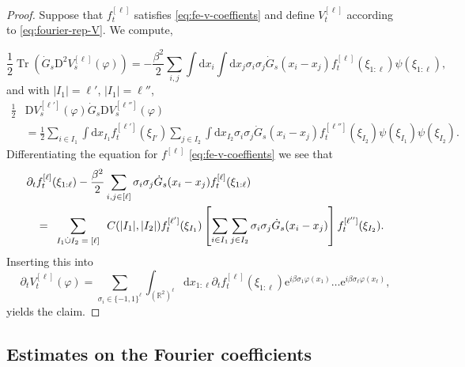 \documentclass[11pt, a4paper]{scrartcl}
\numberwithin{equation}{section}
\theoremstyle{plain}
\theoremstyle{remark}
\newcommand{\mathD}{\mathrm{D}}
\newcommand{\mathd}{\mathrm{d}}
\newcommand{\mathe}{\mathrm{e}}
\newcommand{\tmop}[1]{\ensuremath{\operatorname{#1}}}
\newcommand{\tmscript}[1]{\text{\scriptsize{$#1$}}}
\begin{document}
\begin{proof}
	Suppose that $f_t^{[\ell]}$ satisfies \eqref{eq:fe-v-coeffients} and define
	$V^{[\ell]}_t$ according to \eqref{eq:fourier-rep-V}. We compute,


	\[ \frac{1}{2} \tmop{Tr} (\dot{G}_s \mathD^2 V^{[\ell]}_s (\varphi)) = -
		\frac{\beta^2}{2}  \sum_{i, j} \int \mathd x_i \int \mathd x_j \sigma_i
		\sigma_j \dot{G}_s (x_i - x_j) f_t^{[\ell]} (\xi_{1 : \ell}) \psi (\xi_{1
			: \ell}), \]
	and with $|I_1| = \ell'$, $|I_1| = \ell''$,
	\[ \begin{aligned}
			\frac{1}{2} & \mathD V_s^{[\ell']} (\varphi) \dot{G}_s \mathD
			V_s^{[\ell'']} (\varphi)                                      \\
			            & = \frac{1}{2} \sum_{i \in I_1} \int \mathd
			x_{I_1} f_t^{[\ell']} (\xi_{I'}) \sum_{j \in I_2} \int \mathd x_{I_2}
			\sigma_i \sigma_j\dot{G}_s (x_i - x_j) f_t^{[\ell'']} (\xi_{I_2}) \psi (\xi_{I_1}) \psi
			(\xi_{I_2}) .
		\end{aligned} \]
	Differentiating the equation for $f^{[\ell]}$ \eqref{eq:fe-v-coeffients} we see that
	\[ \begin{aligned}
			\partial_t & f_t^{[\ell]} (\xi_{1 : \ell}) - \frac{\beta^2}{2}  \sum_{i,
				j \in [\ell]} \sigma_i \sigma_j \dot{G}_s (x_i - x_j) f_t^{[\ell]}
			(\xi_{1 : \ell})                                                                            \\
			           & = \sum_{\tmscript{\begin{array}{c}
						                               I_1 \dot{\cup} I_2 = [\ell] \\
					                               \end{array}}} C (| I_1 |, | I_2 |) f_t^{[\ell']} (\xi_{I_1})
			\left[ \sum_{i \in I_1} \sum_{j \in I_2}
				\sigma_i \sigma_j  \dot{G}_s (x_i - x_j) \right] f_t^{[\ell'']} (\xi_{I_2}).
		\end{aligned}
	\]
	Inserting this into
	\[ \partial_t V_t^{[\ell]} (\varphi) = \sum_{\sigma_i \in \{ - 1, 1
			\}^{\ell}} \int_{(\mathbb{R}^2)^{\ell}} \mathd x_{1 : \ell} \partial_t
		f_t^{[\ell]} (\xi_{1 : \ell}) \mathe^{i \beta \sigma_1 \varphi (x_1)}
		\ldots \mathe^{i \beta \sigma_{\ell} \varphi (x_{\ell})}, \]
	yields the claim.
\end{proof}

\subsection{Estimates on the Fourier
	coefficients}\label{sec:flow-coefficients}
\end{document}
